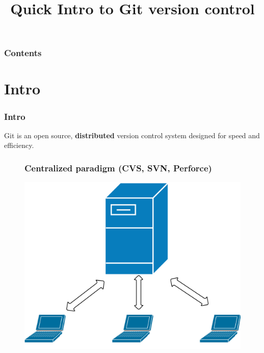 \documentclass{beamer}
\title{Quick Intro to Git version control}
\begin{document}
\begin{frame}
    \titlepage
\end{frame}

\begin{frame}
    \frametitle{Contents}
    \tableofcontents
\end{frame}

\section{Intro}

\begin{frame}
    \frametitle{Intro}
    \begin{center}
        Git is an open source, \textbf{distributed} version control
        system designed for speed and efficiency.
    \end{center}
\end{frame}

\begin{frame}
    \begin{figure}[h!]
        \frametitle{Centralized paradigm (CVS, SVN, Perforce)}
        \begin{center}
            \includegraphics[scale=0.2]{centralized.png}
        \end{center}
    \end{figure}
\end{frame}
\end{document}

